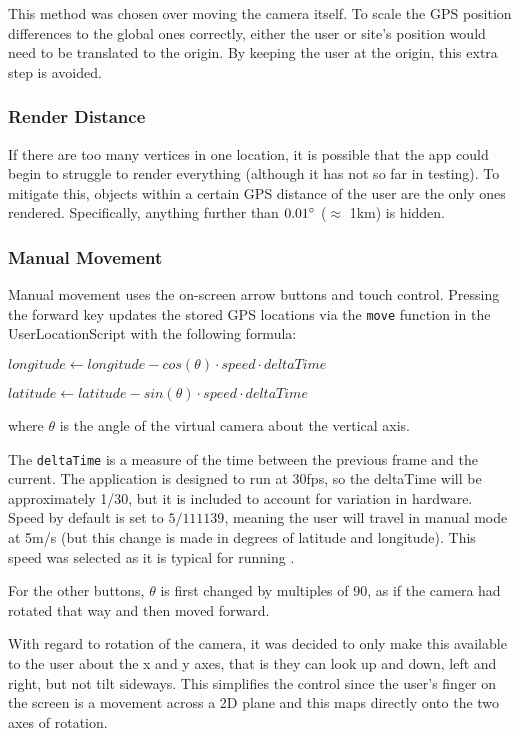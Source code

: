 \documentclass[12pt, a4paper]{article}
\begin{document}
This method was chosen over moving the camera itself. To scale the GPS position differences to the global ones correctly, either the user or site's position would need to be translated to the origin. By keeping the user at the origin, this extra step is avoided. 

\subsubsection{Render Distance}
If there are too many vertices in one location, it is possible that the app could begin to struggle to render everything (although it has not so far in testing). To mitigate this, objects within a certain GPS distance of the user are the only ones rendered. Specifically, anything further than $0.01\degree$ ($\approx$ 1km) is hidden.

\subsubsection{Manual Movement}
\label{manualmovement}
Manual movement uses the on-screen arrow buttons and touch control. Pressing the forward key updates the stored GPS locations via the \verb|move| function in the UserLocationScript with the following formula:

\hspace{1cm} $longitude \leftarrow longitude - cos(\theta) \cdot speed \cdot deltaTime$

\hspace{1cm} $latitude  \leftarrow  latitude - sin(\theta) \cdot speed \cdot deltaTime$

where $\theta$ is the angle of the virtual camera about the vertical axis.

The \verb|deltaTime| is a measure of the time between the previous frame and the current. The application is designed to run at 30fps, so the deltaTime will be approximately 1/30, but it is included to account for variation in hardware. Speed by default is set to $5/111139$, meaning the user will travel in manual mode at 5m/s (but this change is made in degrees of latitude and longitude). This speed was selected as it is typical for running \cite{movement:runningspeed}.

For the other buttons, $\theta$ is first changed by multiples of 90\degree, as if the camera had rotated that way and then moved forward.

With regard to rotation of the camera, it was decided to only make this available to the user about the x and y axes, that is they can look up and down, left and right, but not tilt sideways. This simplifies the control since the user's finger on the screen is a movement across a 2D plane and this maps directly onto the two axes of rotation. 
\end{document}
